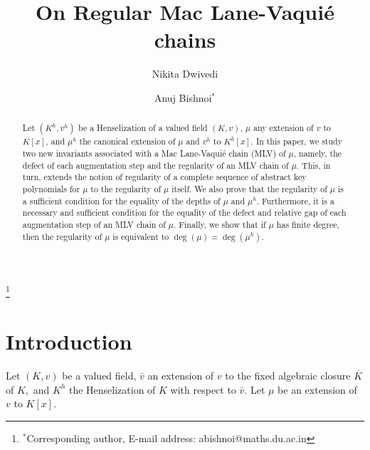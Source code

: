 \documentclass[11pt]{amsart}
\theoremstyle{definition}
\theoremstyle{remark}
\numberwithin{equation}{section}
\begin{document}
	
	\title[On Regular Mac Lane-Vaqui\'e chains]{On Regular Mac Lane-Vaqui\'e chains}
	\author[Nikita Dwivedi]{Nikita Dwivedi}
	\address{Department of Mathematics\\ University of Delhi\\  Delhi-110007, India.}
	\author[Anuj Bishnoi]{Anuj Bishnoi$^\ast$}
	\address{Department of Mathematics\\  University of Delhi \\   Delhi-110007, India.}
	
	\begin{abstract}
   Let $(K^h,v^h)$ be a Henselization of a valued field $(K,v)$, $\mu$ any extension of $v$ to $K[x]$, and $\mu^h$ the canonical extension of $\mu$ and $v^h$ to $K^h[x].$ In this paper, we study two new invariants associated with a Mac Lane-Vaqui\'e chain (MLV) of $\mu$, namely, the defect of each augmentation step and the regularity of an MLV chain of $\mu$. This, in turn, extends the notion of regularity of a complete sequence of abstract key polynomials for $\mu$ to the regularity of $\mu$ itself. We also prove that the regularity of $\mu$ is a sufficient condition for the equality of the depths of $\mu$ and $\mu^h$. Furthermore, it is a necessary and sufficient condition for the equality of the defect and relative gap of each augmentation step of an MLV chain of $\mu.$ Finally, we show that if $\mu$ has finite degree, then the regularity of $\mu$ is equivalent to $\deg(\mu)=\deg(\mu^h).$
	\end{abstract}
	\thanks{$^\ast$Corresponding author, E-mail address: abishnoi@maths.du.ac.in}
	\maketitle
	
	
	\section{Introduction}
Let $(K,v)$ be a valued field, $\bar{v}$ an extension of $v$ to the fixed algebraic closure $\overline{K}$ of $K,$ and $K^h$ the Henselization of $K$ with respect to $\bar{v}.$ Let $\mu$ be an extension of $v$ to $K[x].$
\end{document}
